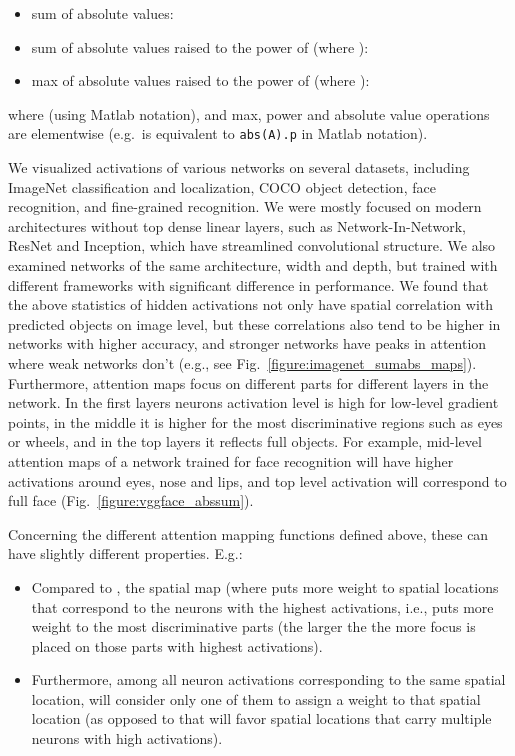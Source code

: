 \documentclass{article} \usepackage{iclr2017_conference}
\begin{document}
\begin{itemize}
  \item sum of absolute values: 
  \item sum of absolute values raised to the power of  (where ): 
  \item max of absolute values raised to the power of  (where ): 
\end{itemize}
where  (using Matlab notation), and max, power and absolute value operations are elementwise (e.g.\  is equivalent to \texttt{abs(A).p} in Matlab notation).


We visualized activations of various networks on several datasets, including ImageNet classification and localization, COCO object detection, face recognition, and fine-grained recognition. We were mostly focused on modern architectures without top dense linear layers, such as Network-In-Network, ResNet and Inception, which have streamlined convolutional structure. We also examined networks of the same architecture, width and depth, but trained with different frameworks with significant difference in performance. We found that the above statistics of hidden activations not only have spatial correlation with predicted objects on image level, but these correlations also tend to be higher in networks with higher accuracy, and stronger networks have peaks in attention where weak networks don't (e.g., see Fig.~\ref{figure:imagenet_sumabs_maps}).
Furthermore, attention maps focus on different parts for different layers in the network. In the first layers neurons activation level is high for low-level gradient points, in the middle it is higher for the most discriminative regions such as eyes or wheels, and in the top layers it reflects full objects. For example, mid-level attention maps of a network trained for face recognition \cite{Parkhi15} will have higher activations around eyes, nose and lips, and top level activation will correspond to full face (Fig.~\ref{figure:vggface_abssum}).

Concerning the different attention mapping functions defined above, these can have slightly different properties. E.g.:
\begin{itemize}
\item
Compared to , the spatial map   (where  puts more weight to spatial locations that correspond to   the  neurons with the highest activations, i.e., puts more weight to the most discriminative parts (the larger the  the more focus is placed on those parts with  highest activations).

\item
Furthermore, among all neuron activations corresponding to the same spatial location,  will consider only one of them to assign a weight to that spatial location (as opposed to  that will favor spatial locations that carry multiple neurons with high activations).
\end{itemize}
\end{document}
